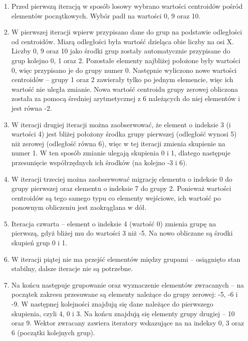 \begin{enumerate}
	\item Przed pierwszą iteracją w sposób losowy wybrano wartości centroidów pośród elementów początkowych. Wybór padł na wartości 0, 9 oraz 10.
	\item W pierwszej iteracji wpierw przypisano dane do grup na podstawie odległości od centroidów. Miarą odległości była wartość dzieląca obie liczby na osi X. Liczby 0, 9 oraz 10 jako środki grup zostały automatycznie przypisane do grup kolejno 0, 1 oraz 2. Pozostałe elementy najbliżej położone były wartości 0, więc przypisano je do grupy numer 0. Następnie wyliczono nowe wartości centroidów -- grupy 1 oraz 2 zawierały tylko po jednym elemencie, więc ich wartość nie uległa zmianie. Nowa wartość centroidu grupy zerowej obliczona została za pomocą średniej arytmetycznej z 6 należących do niej elementów i jest równa -2.
	\item W iteracji drugiej iteracji można zaobserwować, że element o indeksie 3 (i wartości 4) jest bliżej położony środka grupy pierwszej (odległość wynosi 5) niż zerowej (odległość równa 6), więc w tej iteracji zmienia skupienie na numer 1. W ten sposób zmianie ulegają skupienia 0 i 1, dlatego następuje przesunięcie współrzędnych ich środków (na kolejno -3 i 6).
	\item W iteracji trzeciej można zaobserwować migrację elementu o indeksie 0 do grupy pierwszej oraz elementu o indeksie 7 do grupy 2. Ponieważ wartości centroidów są tego samego typu co elementy wejściowe, ich wartość po ponownym obliczeniu jest zaokrąglana w dół.
	\item Iteracja czwarta -- element o indeksie 4 (wartość 0) zmienia grupę na pierwszą, gdyż bliżej mu do wartości 3 niż -5. Na nowo obliczane są środki skupień grup 0 i 1.
	\item W iteracji piątej nie ma przejść elementów między grupami -- osiągnięto stan stabilny, dalsze iteracje nie są potrzebne.
	\item Na końcu następuje grupowanie oraz wyznaczenie elementów zwracanych -- na początek zakresu przesuwane są elementy należące do grupy zerowej: -5, -6 i -9. W następnej kolejności znajdują się dane należące do pierwszego skupienia, czyli 4, 0 i 3. Na końcu znajdują się elementy grupy drugiej -- 10 oraz 9. Wektor zwracany zawiera iteratory wskazujące na na indeksy 0, 3 oraz 6 (początki kolejnych grup).
\end{enumerate}

